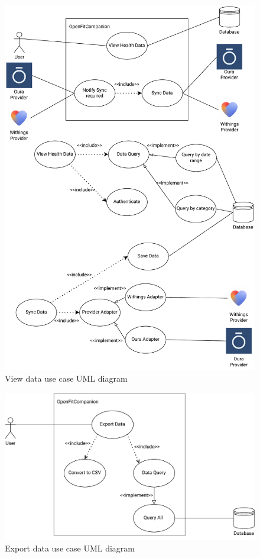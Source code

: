 \begin{figure}
    
    \centering
    \includegraphics[width=\textwidth,height=\textheight,keepaspectratio]{../images/viewFunc.pdf}
    \caption{View data use case UML diagram}
    \label{fig:2}
\end{figure}
\begin{figure}
    
    \centering
    \includegraphics[width=\textwidth,height=\textheight,keepaspectratio]{../images/exportDataFunc.pdf}
    \caption{Export data use case UML diagram}
    \label{fig:3}
    
\end{figure}
